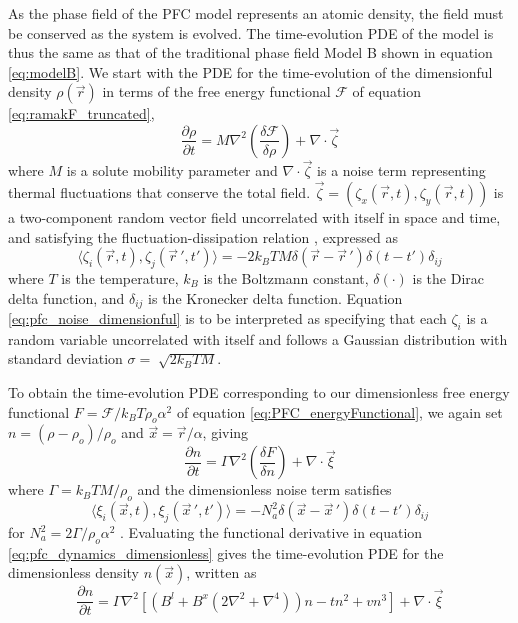 As the phase field of the PFC model represents an atomic density, the field must be conserved as the system is evolved. The time-evolution PDE of the model is thus the same as that of the traditional phase field Model B shown in equation \ref{eq:modelB}. We start with the PDE for the time-evolution of the dimensionful density $\rho(\vec{r})$ in terms of the free energy functional $\mathcal{F}$ of equation \ref{eq:ramakF_truncated},
\begin{equation}\label{eq:pfc_dynamics_dimensionful}
\frac{\partial \rho}{\partial t} = M \nabla^2 \left(\frac{\delta \mathcal{F}}{\delta \rho}\right) + \nabla \cdot \vec\zeta
\end{equation}
where $M$ is a solute mobility parameter and $\nabla \cdot \vec\zeta$ is a noise term representing thermal fluctuations that conserve the total field. $\vec\zeta=(\zeta_x(\vec{r},t),\zeta_y(\vec{r},t))$ is a two-component random vector field uncorrelated with itself in space and time, and satisfying the fluctuation-dissipation relation \cite{chaikin_condensed,sancho_noise}, expressed as
\begin{equation}\label{eq:pfc_noise_dimensionful}
\langle \zeta_i(\vec{r},t),\zeta_j(\vec{r}\,',t') \rangle = -2 k_B T M \delta(\vec{r}-\vec{r}\,')\delta(t-t')\delta_{ij}
\end{equation}
where $T$ is the temperature, $k_B$ is the Boltzmann constant, $\delta(\cdot)$ is the Dirac delta function, and $\delta_{ij}$ is the Kronecker delta function. Equation \ref{eq:pfc_noise_dimensionful} is to be interpreted as specifying that each $\zeta_i$ is a random variable uncorrelated with itself and follows a Gaussian distribution with standard deviation $\sigma = \sqrt[]{2k_B T M}$.

To obtain the time-evolution PDE corresponding to our dimensionless free energy functional $F=\mathcal{F}/k_B T \rho_o \alpha^2$ of equation \ref{eq:PFC_energyFunctional}, we again set $n=(\rho-\rho_o)/\rho_o$ and $\vec{x}=\vec{r}/\alpha$, giving
\begin{equation}\label{eq:pfc_dynamics_dimensionless}
\frac{\partial n}{\partial t} = \Gamma \nabla^2 \left(\frac{\delta F}{\delta n}\right) + \nabla \cdot \vec\xi
\end{equation}
where $\Gamma = k_B T M/\rho_o $ and the dimensionless noise term satisfies
\begin{equation}\label{eq:pfc_noise_dimensionless}
\langle \xi_i(\vec{x},t),\xi_j(\vec{x}\,',t') \rangle = - N_a^2 \delta(\vec{x}-\vec{x}\,')\delta(t-t')\delta_{ij}
\end{equation}
for $N_a^2=2\Gamma/\rho_o \alpha^2$ \cite{kocher16}. Evaluating the functional derivative in equation \ref{eq:pfc_dynamics_dimensionless} gives the time-evolution PDE for the dimensionless density $n(\vec{x})$, written as
\begin{equation}\label{eq:pfc_dynamics_dimensionless_final}
\frac{\partial n}{\partial t} = \Gamma \nabla^2 \left[(B^l +B^x (2\nabla^2+\nabla^4))n -tn^2+vn^3\right] + \nabla \cdot \vec\xi
\end{equation}


